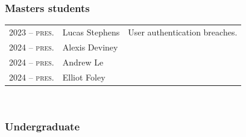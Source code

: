 \documentclass[10pt,singlecolumn]{article} %
\begin{document}
\subsubsection*{Masters students}
\begin{tabular}{rll}
2023 -- \textsc{pres.} & Lucas Stephens & User authentication breaches.\\ 
2024 -- \textsc{pres.} & Alexis Deviney & \\
2024 -- \textsc{pres.} & Andrew Le & \\ 
2024 -- \textsc{pres.} & Elliot Foley & \\ 
\end{tabular}\\

\subsubsection*{Undergraduate}
\end{document}
